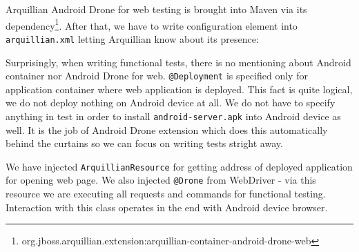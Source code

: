 \documentclass[12pt,final,oneside]{fithesis}
\begin{document}
Arquillian Android Drone for web testing is brought into Maven via its dependency\footnote{org.jboss.arquillian.extension:arquillian-container-android-drone-web}. After that, we have to write configuration element into \texttt{arquillian.xml} letting Arquillian know about its presence: 



Surprisingly, when writing functional tests, there is no mentioning about Android container nor Android Drone for web. \texttt{@Deployment} is specified only for application container where web application is deployed. This fact is quite logical, we do not deploy nothing on Android device at all. We do not have to specify anything in test in order to install \texttt{android-server.apk} into Android device as well. It is the job of Android Drone extension which does this automatically behind the curtains so we can focus on writing tests stright away.

We have injected \texttt{ArquillianResource} for getting address of deployed application for opening web page. We also injected \texttt{@Drone} from WebDriver - via this resource we are executing all requests and commands for functional testing. Interaction with this class operates in the end with Android device browser.


\end{document}
